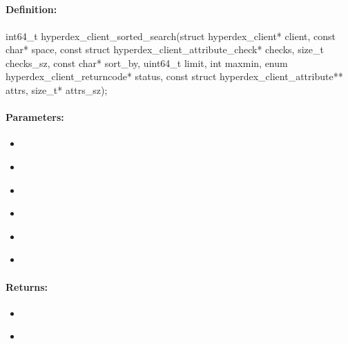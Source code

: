 \pagebreak
\subsection{}
\label{api:c:sorted_search}


\paragraph{Definition:}
\begin{ccode}
int64_t hyperdex_client_sorted_search(struct hyperdex_client* client,
        const char* space,
        const struct hyperdex_client_attribute_check* checks, size_t checks_sz,
        const char* sort_by,
        uint64_t limit,
        int maxmin,
        enum hyperdex_client_returncode* status,
        const struct hyperdex_client_attribute** attrs, size_t* attrs_sz);
\end{ccode}

\paragraph{Parameters:}
\begin{itemize}[noitemsep]
\item {}\\

\item {}\\

\item {}\\

\item {}\\

\item {}\\

\item {}\\

\end{itemize}

\paragraph{Returns:}
\begin{itemize}[noitemsep]
\item {}\\

\item {}\\

\end{itemize}

